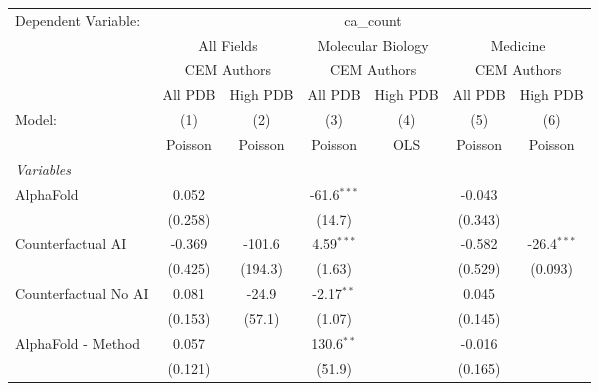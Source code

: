 \begingroup
\centering
\begin{tabular}{lcccccc}
   \tabularnewline \midrule \midrule
   Dependent Variable: & \multicolumn{6}{c}{ca\_count}\\
 & \multicolumn{2}{c}{All Fields} & \multicolumn{2}{c}{Molecular Biology} & \multicolumn{2}{c}{Medicine} \\
\cmidrule(lr){2-3} \cmidrule(lr){4-5} \cmidrule(lr){6-7}
 & \multicolumn{2}{c}{CEM Authors} & \multicolumn{2}{c}{CEM Authors} & \multicolumn{2}{c}{CEM Authors} \\
\cmidrule(lr){2-3} \cmidrule(lr){4-5} \cmidrule(lr){6-7}
 & \multicolumn{1}{c}{All PDB} & \multicolumn{1}{c}{High PDB} & \multicolumn{1}{c}{All PDB} & \multicolumn{1}{c}{High PDB} & \multicolumn{1}{c}{All PDB} & \multicolumn{1}{c}{High PDB} \\
\cmidrule(lr){2-2} \cmidrule(lr){3-3} \cmidrule(lr){4-4} \cmidrule(lr){5-5} \cmidrule(lr){6-6} \cmidrule(lr){7-7}
   Model:                                                     & (1)          & (2)     & (3)           & (4)  & (5)     & (6)\\  
                                                              &  Poisson     & Poisson & Poisson       & OLS  & Poisson & Poisson\\  
   \midrule
   \emph{Variables}\\
   AlphaFold                                                  & 0.052        &         & -61.6$^{***}$ &      & -0.043  &   \\   
                                                              & (0.258)      &         & (14.7)        &      & (0.343) &   \\   
   Counterfactual AI                                          & -0.369       & -101.6  & 4.59$^{***}$  &      & -0.582  & -26.4$^{***}$\\   
                                                              & (0.425)      & (194.3) & (1.63)        &      & (0.529) & (0.093)\\   
   Counterfactual No AI                                       & 0.081        & -24.9   & -2.17$^{**}$  &      & 0.045   &   \\   
                                                              & (0.153)      & (57.1)  & (1.07)        &      & (0.145) &   \\   
   AlphaFold - Method                                         & 0.057        &         & 130.6$^{**}$  &      & -0.016  &   \\   
                                                              & (0.121)      &         & (51.9)        &      & (0.165) &   \\   

\end{tabular}
